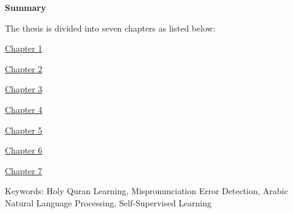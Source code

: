 \cleardoublepage
\newpage
\thispagestyle{empty}
{}



\begin{center}\huge \textbf{Summary}\end{center}


%
The thesis is divided into seven chapters as listed below:

\begin{flushleft}
\underline{Chapter 1}
\end{flushleft}




\begin{flushleft}
\underline{Chapter 2}
\end{flushleft}



\begin{flushleft}
\underline{Chapter 3}
\end{flushleft}



\begin{flushleft}
\underline{Chapter 4}
\end{flushleft}




\begin{flushleft}
\underline{Chapter 5}
\end{flushleft}



\begin{flushleft}
\underline{Chapter 6}
\end{flushleft}



\begin{flushleft}
\underline{Chapter 7}
\end{flushleft}

\vfill 

\begin{flushleft}
\large

Keywords: Holy Quran Learning, Mispronunciation Error Detection, Arabic Natural Language Processing, Self-Supervised Learning
\end{flushleft}



